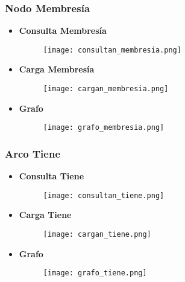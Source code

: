 \documentclass[a4paper]{article}
\begin{document}
\newpage

\subsubsection{\Large{Nodo Membresía}}

\begin{itemize}

    \item \textbf{\large{Consulta Membresía}}

    \begin{figure}[H]
        \centering
        \texttt{[image: consultan\_membresia.png]}
        \label{fig:consultan_membresia}
    \end{figure}

    \item \textbf{\large{Carga Membresía}}

    \begin{figure}[H]
        \centering
        \texttt{[image: cargan\_membresia.png]}
        \label{fig:cargan_membresia}
    \end{figure}

    \item \textbf{\large{Grafo}}

    \begin{figure}[H]
        \centering
        \texttt{[image: grafo\_membresia.png]}
        \label{fig:grafo_membresia}
    \end{figure}

\end{itemize}

\subsubsection{\Large{Arco Tiene}}

\begin{itemize}

    \item \textbf{\large{Consulta Tiene}}

    \begin{figure}[H]
        \centering
        \texttt{[image: consultan\_tiene.png]}
        \label{fig:consultan_tiene}
    \end{figure}

\newpage

    \item \textbf{\large{Carga Tiene}}

    \begin{figure}[H]
        \centering
        \texttt{[image: cargan\_tiene.png]}
        \label{fig:cargan_tiene}
    \end{figure}

    \item \textbf{\large{Grafo}}

    \begin{figure}[H]
        \centering
        \texttt{[image: grafo\_tiene.png]}
        \label{fig:grafo_tiene}
    \end{figure}

\end{itemize}
\end{document}
